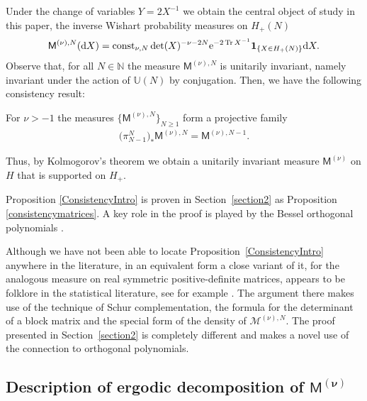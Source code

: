 Under the change of variables $Y=2X^{-1}$ we obtain the central object of study in this paper, the inverse Wishart probability measures on $H_+(N)$
\begin{align}\label{MeasureDefinition}
\mathsf{M}^{(\nu),N}({\rm d}X)= \operatorname{const}_{\nu, N} \det(X)^{-\nu-2N} {\rm e}^{-2\operatorname{Tr}X^{-1}}\mathbf{1}_{ \{X \in H_+(N) \}}{\rm d}X.
\end{align}
Observe that, for all $N \in \mathbb{N}$ the measure $\mathsf{M}^{(\nu),N}$ is unitarily invariant, namely invariant under the action of $\mathbb{U}(N)$ by conjugation. Then, we have the following consistency result:

\begin{Proposition}\label{ConsistencyIntro} For $\nu >-1$ the measures $\big\{\mathsf{M}^{(\nu),N}\big\}_{N\ge 1}$ form a projective family
\begin{gather*}
\big(\pi_{N-1}^N\big)_*\mathsf{M}^{(\nu),N}=\mathsf{M}^{(\nu),N-1}.
\end{gather*}
\end{Proposition}

Thus, by Kolmogorov's theorem we obtain a unitarily invariant measure $\mathsf{M}^{(\nu)}$ on $H$ that is supported on $H_{+}$.

Proposition \ref{ConsistencyIntro} is proven in Section~\ref{section2} as Proposition \ref{consistencymatrices}. A key role in the proof is played by the Bessel orthogonal polynomials \cite{BesselPolynomials}.

\begin{Remark}Although we have not been able to locate Proposition~\ref{ConsistencyIntro} anywhere in the lite\-ra\-ture, in an equivalent form a close variant of it, for the analogous measure on real symmetric positive-definite matrices, appears to be folklore in the statistical literature, see for example \cite[Chapter~3]{StatisticalMatrixAnalysis}. The argument there makes use of the technique of Schur complementation, the formula for the determinant of a block matrix and the special form of the density of $\mathcal{M}^{(\nu),N}$. The proof presented in Section~\ref{section2} is completely different and makes a novel use of the connection to orthogonal polynomials.
\end{Remark}

\subsection[Description of ergodic decomposition of $\mathsf{M}^{(\nu)}$]{Description of ergodic decomposition of $\boldsymbol{\mathsf{M}^{(\nu)}}$}\label{section1.4}


